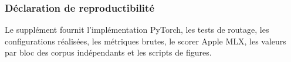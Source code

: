 \documentclass[10pt]{article}
\theoremstyle{definition}
\theoremstyle{remark}
\begin{document}
\subsubsection*{D\'{e}claration de reproductibilit\'{e}}
Le suppl\'{e}ment fournit l'impl\'{e}mentation PyTorch, les tests de routage, les configurations r\'{e}alis\'{e}es, les m\'{e}triques brutes, le scorer Apple MLX, les valeurs par bloc des corpus ind\'{e}pendants et les scripts de figures.



\end{document}
